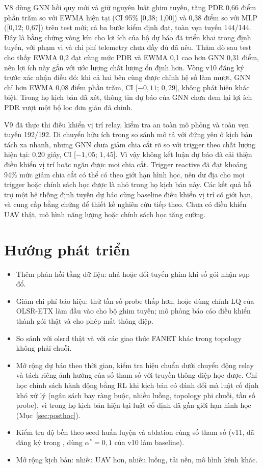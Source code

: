 \documentclass[12pt,a4paper]{report}
\newcommand{\code}[1]{\texttt{\detokenize{#1}}}
\begin{document}
V8 dùng GNN hồi quy mới và giữ nguyên luật ghim tuyến, tăng PDR 0,66 điểm
phần trăm so với EWMA hiện tại (CI 95\% [0,38; 1,00]) và 0,38 điểm so với
MLP ([0,12; 0,67]) trên test mới; cả ba bước kiểm định đạt, toàn vẹn tuyến
144/144. Đây là bằng chứng vòng kín cho lợi ích của bộ dự báo đã triển khai
trong định tuyến, với phạm vi và chi phí telemetry chưa đầy đủ đã nêu. Thăm dò
sau test cho thấy EWMA 0,2 đạt cùng mức PDR và EWMA 0,1 cao hơn GNN 0,31 điểm,
nên lợi ích này gắn với ước lượng chất lượng ổn định hơn. Vòng v10 đăng ký
trước xác nhận điều đó: khi cả hai bên cùng được chỉnh hệ số làm mượt, GNN
chỉ hơn EWMA 0,08 điểm phần trăm, CI [$-0{,}11$; $0{,}29$], không phát hiện
khác biệt. Trong họ kịch bản đã xét, thông tin dự báo của GNN chưa đem lại
lợi ích PDR vượt một bộ lọc đơn giản đã chỉnh.

V9 đã thực thi điều khiển vị trí relay, kiểm tra an toàn mô phỏng và toàn
vẹn tuyến 192/192. Di chuyển hữu ích trong so sánh mô tả với đứng yên ở
kịch bản tách xa nhanh, nhưng GNN chưa giảm chia cắt rõ so với trigger theo
chất lượng hiện tại: 0,20 giây, CI [$-1{,}05$; $1{,}45$]. Vì vậy không kết
luận dự báo đã cải thiện điều khiển vị trí hoặc ngăn được mọi chia cắt.
Trigger reactive đã đạt khoảng 94\% mức giảm chia cắt có thể có theo giới hạn
hình học, nên dư địa cho mọi trigger hoặc chính sách học được là nhỏ trong họ
kịch bản này.
Các kết quả hỗ trợ một hệ thống định tuyến dự báo cùng baseline điều khiển
vị trí có giới hạn, và cung cấp bằng chứng để thiết kế nghiên cứu tiếp theo.
Chưa có điều khiển UAV thật, mô hình năng lượng hoặc chính sách học tăng cường.

\section{Hướng phát triển}
\begin{itemize}
  \item Thêm phản hồi tầng dữ liệu: nhả hoặc đổi tuyến ghim khi số gói nhận sụp đổ.
  \item Giảm chi phí báo hiệu: thử tần số probe thấp hơn, hoặc dùng chính LQ của OLSR-ETX làm đầu vào cho bộ ghim tuyến; mô phỏng báo cáo điều khiển thành gói thật và cho phép mất thông điệp.
  \item So sánh với olsrd thật và với các giao thức FANET khác trong topology không phải chuỗi.
  \item Mở rộng dự báo theo thời gian, kiểm tra hiệu chuẩn dưới chuyển động relay và tách riêng ảnh hưởng của số tham số với truyền thông điệp học được. Chỉ học chính sách hành động bằng RL khi kịch bản có đánh đổi mà luật cố định khó xử lý (ngân sách bay ràng buộc, nhiều luồng, topology phi chuỗi, tần số probe), vì trong họ kịch bản hiện tại luật cố định đã gần giới hạn hình học (Mục~\ref{sec:posthoc}).
  \item Kiểm tra độ bền theo seed huấn luyện và ablation cùng số tham số (v11, đã đăng ký trong \code{docs/service_v11_protocol.md}, dùng $\alpha^\ast=0{,}1$ của v10 làm baseline).
  \item Mở rộng kịch bản: nhiều UAV hơn, nhiều luồng, tải nền, mô hình kênh khác.
\end{itemize}
\end{document}
